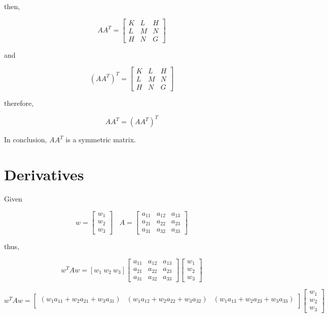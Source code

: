 then,

\begin{equation}
    AA^T = 
    \begin{bmatrix}
        K & L & H\\
        L & M & N\\
        H & N & G
    \end{bmatrix}    
\end{equation}

and

$$
(AA^T)^T = 
\begin{bmatrix}
    K & L & H\\
    L & M & N\\
    H & N & G
\end{bmatrix}
$$

therefore,

\begin{equation}
    AA^T = (AA^T)^T
\end{equation}

In conclusion, $AA^T$ is a symmetric matrix.

\section{Derivatives}
Given

$$
w = 
\begin{bmatrix}
    w_1\\
    w_2\\
    w_3
\end{bmatrix}
\ \ \ \ A =
\begin{bmatrix}
    a_{11} & a_{12} & a_{13}\\
    a_{21} & a_{22} & a_{23}\\
    a_{31} & a_{32} & a_{33}
\end{bmatrix}
$$

thus,

$$
w^TAw =
[w_1\ w_2\ w_3]
\begin{bmatrix}
    a_{11} & a_{12} & a_{13}\\
    a_{21} & a_{22} & a_{23}\\
    a_{31} & a_{32} & a_{33}
\end{bmatrix}
\begin{bmatrix}
    w_1\\
    w_2\\
    w_3
\end{bmatrix}
$$

$$
w^TAw =
\begin{bmatrix}
    (w_1a_{11} + w_2a_{21} + w_3a_{31}) & (w_1a_{12} + w_2a_{22} + w_3a_{32}) & (w_1a_{13} + w_2a_{23} + w_3a_{33})\\
\end{bmatrix}
\begin{bmatrix}
    w_1\\
    w_2\\
    w_3
\end{bmatrix}
$$

